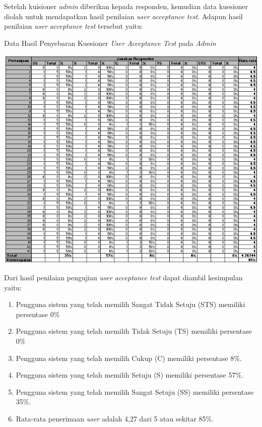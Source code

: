 Setelah kuisioner \textit{admin} diberikan kepada responden, kemudian data kuesioner diolah untuk mendapatkan hasil penilaian \textit{user acceptance test}. Adapun hasil penilaian \textit{user acceptance test} tersebut yaitu:

\begin{table}[H]
	\centering
	\caption{Data Hasil Penyebaran Kuesioner \textit{User Acceptance Test} pada \textit{Admin}}
	\includegraphics[width=1\textwidth]{gambar/Hasil_Admin}
\end{table}

Dari hasil penilaian pengujian \textit{user acceptance test} dapat diambil kesimpulan yaitu:

\begin{enumerate}
	\item Pengguna sistem yang telah memilih Sangat Tidak Setuju (STS) memiliki persentase 0\%
	\item Pengguna sistem yang telah memilih Tidak Setuju (TS) memiliki persentase 0\%
	\item Pengguna sistem yang telah memilih Cukup (C) memiliki persentase 8\%.
	\item Pengguna sistem yang telah memilih Setuju (S) memiliki persentase 57\%.
	\item Pengguna sistem yang telah memilih Sangat Setuju (SS) memiliki persentase 35\%.
	\item Rata-rata penerimaan \textit{user} adalah 4,27 dari 5 atau sekitar 85\%.
\end{enumerate}

